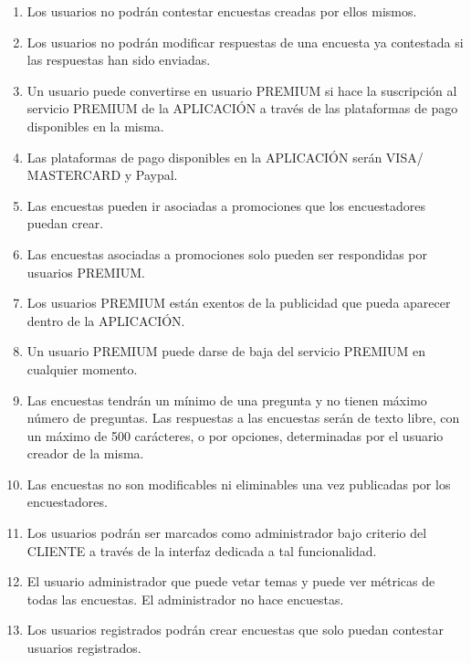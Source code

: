 \documentclass[a4paper,11pt]{report}
\begin{document}
\begin{enumerate}
		\item Los usuarios no podrán contestar encuestas creadas por ellos mismos.

		\item Los usuarios no podrán modificar respuestas de una encuesta ya
		contestada si las respuestas han sido enviadas.

		\item Un usuario puede convertirse en usuario PREMIUM si hace la suscripción
		al servicio PREMIUM de la APLICACIÓN a través de las plataformas de pago
		disponibles en la misma.

		\item Las plataformas de pago disponibles en la APLICACIÓN serán VISA/
		MASTERCARD y Paypal.

		\item Las encuestas pueden ir asociadas a promociones que los encuestadores
		puedan crear.

		\item Las encuestas asociadas a promociones solo pueden ser respondidas por
		usuarios PREMIUM.

		\item Los usuarios PREMIUM están exentos de la publicidad que pueda aparecer
		dentro de la APLICACIÓN.

		\item Un usuario PREMIUM puede darse de baja del servicio PREMIUM en cualquier
		momento.

		\item Las encuestas tendrán un mínimo de una pregunta y no tienen máximo
		número de preguntas. Las respuestas a las encuestas serán de texto libre,
		con un máximo de 500 carácteres, o por opciones, determinadas por el usuario
		creador de la misma.

		\item Las encuestas no son modificables ni eliminables una vez publicadas
		por los encuestadores.

        \item Los usuarios podrán ser marcados como administrador bajo criterio del
        CLIENTE a través de la interfaz dedicada a tal funcionalidad.

		\item El usuario administrador que puede vetar temas y puede ver métricas
		de todas las encuestas. El administrador no hace encuestas.

		\item Los usuarios registrados podrán crear encuestas que solo puedan
		contestar usuarios registrados.


\end{enumerate}
\end{document}

